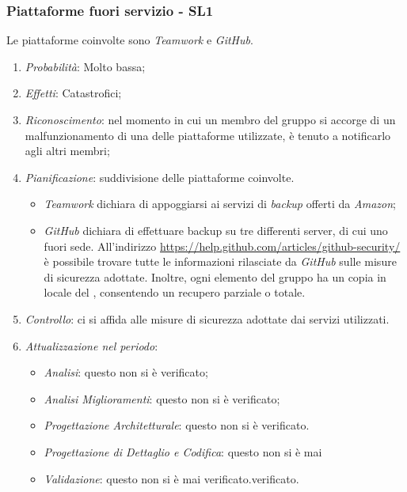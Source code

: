\subsubsection{Piattaforme fuori servizio - SL1}
Le piattaforme coinvolte sono \textit{Teamwork} e \textit{GitHub}.
\begin{enumerate}
\item \textit{Probabilit\`a}: Molto bassa;
\item \textit{Effetti}: Catastrofici;
\item \textit{Riconoscimento}: nel momento in cui un membro del gruppo si accorge di un malfunzionamento di una delle piattaforme utilizzate, è tenuto a notificarlo agli altri membri;
\item \textit{Pianificazione}: suddivisione delle piattaforme coinvolte.
  \begin{itemize}
    \item \textit{Teamwork} dichiara di appoggiarsi ai servizi di \textit{backup} offerti da \textit{Amazon};
    \item \textit{GitHub} dichiara di effettuare backup su tre differenti server, di cui uno fuori sede. All'indirizzo \href{https://help.github.com/articles/github-security/}{https://help.github.com/articles/github-security/} \`e possibile trovare tutte le informazioni rilasciate da \textit{GitHub} sulle misure di sicurezza adottate. Inoltre, ogni elemento del gruppo ha un copia in locale del , consentendo un recupero parziale o totale.
  \end{itemize}
\item \textit{Controllo}: ci si affida alle misure di sicurezza adottate dai servizi utilizzati.
\item \textit{Attualizzazione nel periodo}: 
	\begin{itemize}
	\item \textit{Analisi}: questo  non si è verificato;
	\item \textit{Analisi Miglioramenti}: questo  non si è verificato;
	\item \textit{Progettazione Architetturale}: questo  non si è verificato.
	\item \textit{Progettazione di Dettaglio e Codifica}: questo  non si è mai 
	\item \textit{Validazione}: questo  non si è mai verificato.verificato.
	\end{itemize}
\end{enumerate}

